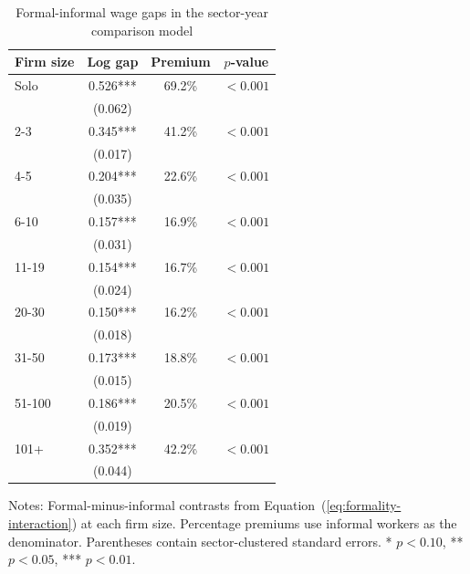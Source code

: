 \begin{table}[htbp]
  \centering
  \caption{Formal-informal wage gaps in the sector-year comparison model}
  \label{tab:formal-wage-gap-by-size}
  \small
  \begin{tabular}{lccc}
    \toprule
    Firm size & Log gap & Premium & $p$-value \\
    \midrule
    Solo & 0.526*** & 69.2\% & $<0.001$ \\
     & (0.062) &  &  \\
    2-3 & 0.345*** & 41.2\% & $<0.001$ \\
     & (0.017) &  &  \\
    4-5 & 0.204*** & 22.6\% & $<0.001$ \\
     & (0.035) &  &  \\
    6-10 & 0.157*** & 16.9\% & $<0.001$ \\
     & (0.031) &  &  \\
    11-19 & 0.154*** & 16.7\% & $<0.001$ \\
     & (0.024) &  &  \\
    20-30 & 0.150*** & 16.2\% & $<0.001$ \\
     & (0.018) &  &  \\
    31-50 & 0.173*** & 18.8\% & $<0.001$ \\
     & (0.015) &  &  \\
    51-100 & 0.186*** & 20.5\% & $<0.001$ \\
     & (0.019) &  &  \\
    101+ & 0.352*** & 42.2\% & $<0.001$ \\
     & (0.044) &  &  \\
    \bottomrule
  \end{tabular}
  \vspace{0.3em}
  \begin{minipage}{0.92\textwidth}
  \footnotesize
  Notes: Formal-minus-informal contrasts from Equation~(\ref{eq:formality-interaction}) at each firm size. Percentage premiums use informal workers as the denominator. Parentheses contain sector-clustered standard errors. * $p<0.10$, ** $p<0.05$, *** $p<0.01$.
  \end{minipage}
\end{table}
